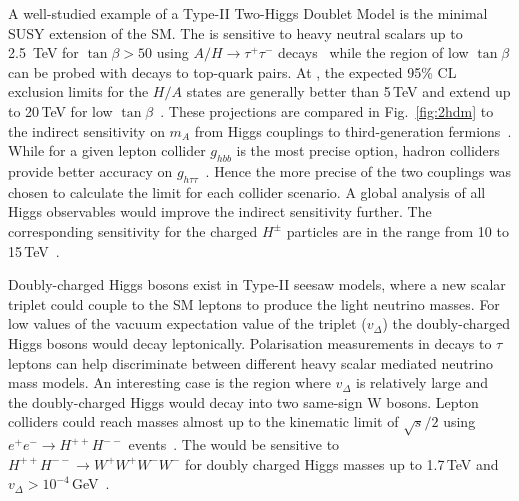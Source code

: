 \documentclass[../report.tex]{subfiles}
\begin{document}
A well-studied example of a Type-II Two-Higgs Doublet Model is the minimal SUSY extension of the SM. The \HLLHC is sensitive to heavy neutral scalars up to 2.5~TeV for $\tan{\beta} > 50$ using $A/H \rightarrow \tau^{+}\tau^{-}$ decays~\cite{Curtin:2014jma} while the region of low $\tan{\beta}$ can be probed with decays to top-quark pairs. At \FCChh, the expected 95\% CL exclusion limits for the $H/A$ states are generally better than 5\,TeV and extend up to 20\,TeV for low $\tan{\beta}$~\cite{Craig:2016ygr}. These projections are compared in Fig.~\ref{fig:2hdm} to the indirect sensitivity on $m_{A}$ from Higgs couplings to third-generation fermions~\cite{Gunion:2002zf, Gorbahn:2015gxa}. While for a given lepton collider $g_{hbb}$ is the most precise option, hadron colliders provide better accuracy on $g_{h\tau\tau}$~\cite{deBlas:2019rxi}. Hence the more precise of the two couplings was chosen to calculate the limit for each collider scenario. A global analysis of all Higgs observables would improve the indirect sensitivity further. The corresponding \FCChh sensitivity for the charged $H^{\pm}$ particles are in the range from 10 to 15\,TeV~\cite{Hajer:2015gka}.

Doubly-charged Higgs bosons exist in Type-II seesaw models, where a new scalar triplet could couple to the SM leptons to produce the light neutrino masses. For low values of the vacuum expectation value of the triplet ($v_{\Delta}$) the doubly-charged Higgs bosons would decay leptonically. Polarisation measurements in decays to $\tau$ leptons can help discriminate between different heavy scalar mediated neutrino mass models. An interesting case is the region where $v_{\Delta}$ is relatively large and the doubly-charged Higgs would decay into two same-sign W bosons. Lepton colliders could reach masses almost up to the kinematic limit of $\sqrt{s}/2$ using $e^{+}e^{-} \rightarrow H^{++}H^{--}$ events~\cite{Agrawal:2018pci}. The \FCChh would be sensitive to $H^{++}H^{--} \rightarrow W^{+}W^{+}W^{-}W^{-}$ for doubly charged Higgs masses up to 1.7\,TeV and $v_{\Delta} > 10^{-4}$\,GeV~\cite{Du:2018eaw}.
\end{document}
